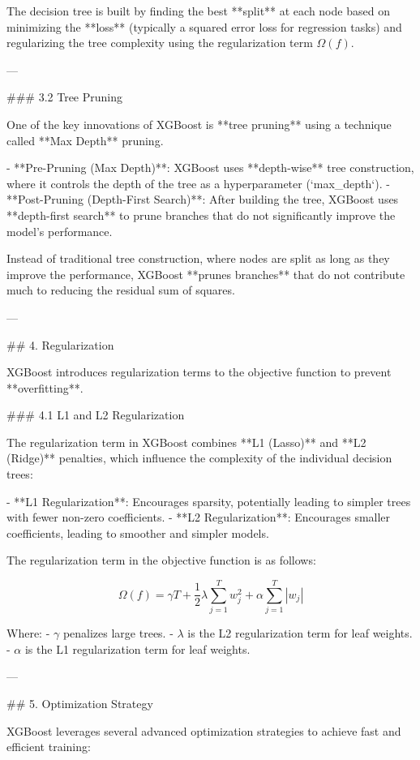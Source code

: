 The decision tree is built by finding the best **split** at each node based on minimizing the **loss** (typically a squared error loss for regression tasks) and regularizing the tree complexity using the regularization term \( \Omega(f) \).

---

### 3.2 Tree Pruning

One of the key innovations of XGBoost is **tree pruning** using a technique called **Max Depth** pruning.

- **Pre-Pruning (Max Depth)**: XGBoost uses **depth-wise** tree construction, where it controls the depth of the tree as a hyperparameter (`max_depth`).
- **Post-Pruning (Depth-First Search)**: After building the tree, XGBoost uses **depth-first search** to prune branches that do not significantly improve the model's performance.

Instead of traditional tree construction, where nodes are split as long as they improve the performance, XGBoost **prunes branches** that do not contribute much to reducing the residual sum of squares.

---

## 4. Regularization

XGBoost introduces regularization terms to the objective function to prevent **overfitting**.

### 4.1 L1 and L2 Regularization

The regularization term in XGBoost combines **L1 (Lasso)** and **L2 (Ridge)** penalties, which influence the complexity of the individual decision trees:

- **L1 Regularization**: Encourages sparsity, potentially leading to simpler trees with fewer non-zero coefficients.
- **L2 Regularization**: Encourages smaller coefficients, leading to smoother and simpler models.

The regularization term in the objective function is as follows:

\[
\Omega(f) = \gamma T + \frac{1}{2} \lambda \sum_{j=1}^T w_j^2 + \alpha \sum_{j=1}^T |w_j|
\]

Where:
- \( \gamma \) penalizes large trees.
- \( \lambda \) is the L2 regularization term for leaf weights.
- \( \alpha \) is the L1 regularization term for leaf weights.

---

## 5. Optimization Strategy

XGBoost leverages several advanced optimization strategies to achieve fast and efficient training:

